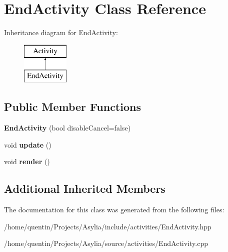 \hypertarget{classEndActivity}{\section{End\-Activity Class Reference}
\label{classEndActivity}
}
Inheritance diagram for End\-Activity\-:\begin{figure}[H]
\begin{center}
\leavevmode
\includegraphics[height=2.000000cm]{classEndActivity}
\end{center}
\end{figure}
\subsection*{Public Member Functions}
\begin{DoxyCompactItemize}
\item 
\hypertarget{classEndActivity_af4e28a8395506f74bbc9f70ac2a987e8}{{\bfseries End\-Activity} (bool disable\-Cancel=false)}\label{classEndActivity_af4e28a8395506f74bbc9f70ac2a987e8}

\item 
\hypertarget{classEndActivity_aa292dbfa6eee70169b4d7df4301990e7}{void {\bfseries update} ()}\label{classEndActivity_aa292dbfa6eee70169b4d7df4301990e7}

\item 
\hypertarget{classEndActivity_a1cf70ac527eb427d60623e8a75307e52}{void {\bfseries render} ()}\label{classEndActivity_a1cf70ac527eb427d60623e8a75307e52}

\end{DoxyCompactItemize}
\subsection*{Additional Inherited Members}


The documentation for this class was generated from the following files\-:\begin{DoxyCompactItemize}
\item 
/home/quentin/\-Projects/\-Asylia/include/activities/End\-Activity.\-hpp\item 
/home/quentin/\-Projects/\-Asylia/source/activities/End\-Activity.\-cpp\end{DoxyCompactItemize}
